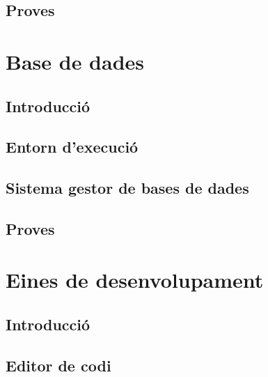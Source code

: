 \documentclass[a4paper,12pt]{ThesisStyle}
\begin{document}
\subsection{Proves}
\label{subsec:decisions_servidor_proves}



\section{Base de dades}
\label{sec:decisions_bdd}

\subsection{Introducció}
\label{subsec:decisions_bdd_intro}



\subsection{Entorn d'execució}
\label{subsec:decisions_bdd_entorn}



\subsection{Sistema gestor de bases de dades}
\label{subsec:decisions_bdd_sgbd}



\subsection{Proves}
\label{subsec:decisions_bdd_proves}



\section{Eines de desenvolupament}
\label{sec:decisions_desenvolupament}

\subsection{Introducció}
\label{subsec:decisions_desenvolupament_intro}



\subsection{Editor de codi}
\label{subsec:decisions_desenvolupament_editor}
\end{document}
